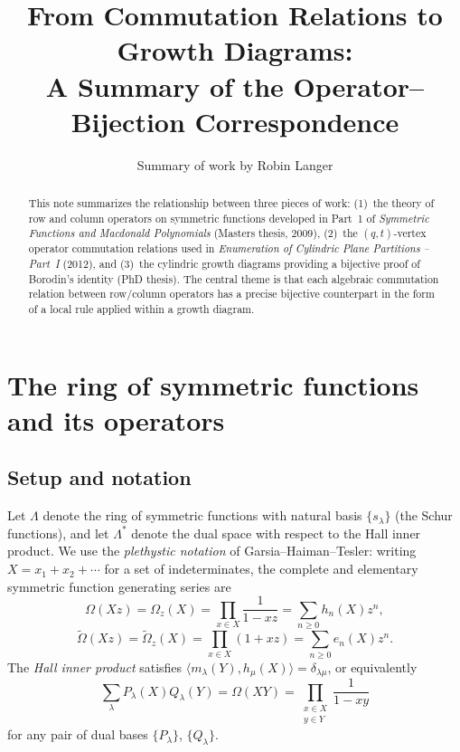 \documentclass[11pt]{article}
\title{From Commutation Relations to Growth Diagrams:\\
A Summary of the Operator--Bijection Correspondence}
\author{Summary of work by Robin Langer}
\date{}
\newcommand{\La}{\Lambda}
\theoremstyle{plain}
\theoremstyle{definition}
\begin{document}
\maketitle

\begin{abstract}
This note summarizes the relationship between three pieces of work:
(1)~the theory of row and column operators on symmetric functions developed in Part~1 of
\emph{Symmetric Functions and Macdonald Polynomials} (Masters thesis, 2009),
(2)~the $(q,t)$-vertex operator commutation relations used in \emph{Enumeration of Cylindric Plane Partitions -- Part~I} (2012), and
(3)~the cylindric growth diagrams providing a bijective proof of Borodin's identity (PhD thesis).
The central theme is that each algebraic commutation relation between row/column operators
has a precise bijective counterpart in the form of a local rule applied within a growth diagram.
\end{abstract}

\tableofcontents

\section{The ring of symmetric functions and its operators}

\subsection{Setup and notation}
Let $\La$ denote the ring of symmetric functions with natural basis $\{s_\lambda\}$ (the Schur functions), and let $\La^*$ denote the dual space with respect to the Hall inner product.
We use the \emph{plethystic notation} of Garsia--Haiman--Tesler: writing $X = x_1 + x_2 + \cdots$ for a set of indeterminates, the complete and elementary symmetric function generating series are
\[
\Omega(Xz) = \Omega_z(X) = \prod_{x \in X} \frac{1}{1 - xz} = \sum_{n \geq 0} h_n(X) z^n,
\]
\[
\tilde\Omega(Xz) = \tilde\Omega_z(X) = \prod_{x \in X} (1 + xz) = \sum_{n \geq 0} e_n(X) z^n.
\]
The \emph{Hall inner product} satisfies $\langle m_\lambda(Y), h_\mu(X) \rangle = \delta_{\lambda\mu}$, or equivalently
\[
\sum_\lambda P_\lambda(X) Q_\lambda(Y) = \Omega(XY) = \prod_{\substack{x \in X \\ y \in Y}} \frac{1}{1-xy}
\]
for any pair of dual bases $\{P_\lambda\}$, $\{Q_\lambda\}$.
\end{document}
